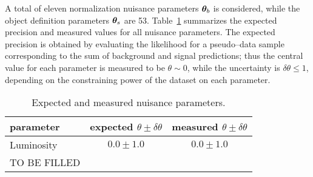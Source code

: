 A total of eleven normalization nuisance parameters $\boldsymbol{\theta}_b$ is
considered, while the object definition parameters $\boldsymbol{\theta}_s$ are 53. 
Table~\ref{tab:nuispar} summarizes the expected precision and measured
values for all nuisance parameters. The expected precision is obtained
by evaluating the likelihood for a pseudo--data sample corresponding
to the sum of background and signal predictions; thus the central
value for each parameter is measured to be $\theta\sim0$, while the
uncertainty is $\delta\theta\leq1$, depending on the constraining power of
the dataset on each parameter.

\begin{table}
  \centering
  \begin{tabular}{lcc}
    \toprule
    parameter & expected $\theta\pm\delta\theta$ & measured $\theta\pm\delta\theta$ \\
    \midrule
    Luminosity & $0.0\pm1.0$& $0.0\pm1.0$\\
    TO BE FILLED & & \\
   \bottomrule
  \end{tabular}
  \caption{Expected and measured nuisance parameters.}
  \label{tab:nuispar}
\end{table}